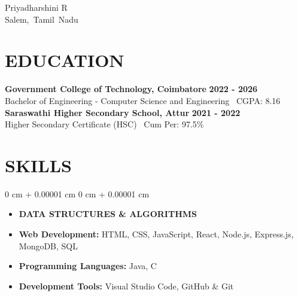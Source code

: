 \documentclass[10pt, letterpaper]{article}
\newenvironment{highlightsforbulletentries}{    \begin{itemize}[        topsep=0.10 cm,        parsep=0.10 cm,        partopsep=0pt,        itemsep=0pt,        leftmargin=10pt    ]}{    \end{itemize}} %
\newenvironment{onecolentry}{    \begin{adjustwidth}{        0 cm + 0.00001 cm    }{        0 cm + 0.00001 cm    }}{    \end{adjustwidth}} %
\newenvironment{header}{    \setlength{\topsep}{0pt}\par\kern\topsep\centering\linespread{1.5}}{    \par\kern\topsep} %
\begin{document}
    \newcommand{\AND}{\unskip        \cleaders\copy\ANDbox\hskip\wd\ANDbox        \ignorespaces    }    \newsavebox\ANDbox    \sbox\ANDbox{$|$}
    \begin{header}        \fontsize{25 pt}{25 pt}\selectfont Priyadharshini R  \\
        \vspace{5 pt}        \normalsize        \mbox{Salem, Tamil Nadu}%
    \vspace{5 pt - 0.3 cm}
\vspace{0.10 cm}
\section{EDUCATION}
\noindent\textbf{Government College of Technology, Coimbatore} \hfill \textbf{2022 - 2026} \\  Bachelor of Engineering - Computer Science and Engineering \textbar\ CGPA: 8.16  
\vspace{0.3 cm}
\noindent\textbf{Saraswathi Higher Secondary School, Attur} \hfill \textbf{2021 - 2022} \\  Higher Secondary Certificate (HSC) \textbar\ Cum Per: 97.5\%

       \section{SKILLS}
\begin{onecolentry}    \begin{highlightsforbulletentries}
   \item \textbf{DATA STRUCTURES \& ALGORITHMS}        \item \textbf{Web Development:} HTML, CSS, JavaScript, React, Node.js, Express.js, MongoDB, SQL        \item \textbf{Programming Languages:} Java, C        \item \textbf{Development Tools:}      Visual Studio Code, GitHub \& Git
    \end{highlightsforbulletentries}\end{onecolentry}


\end{header}
\end{document}
